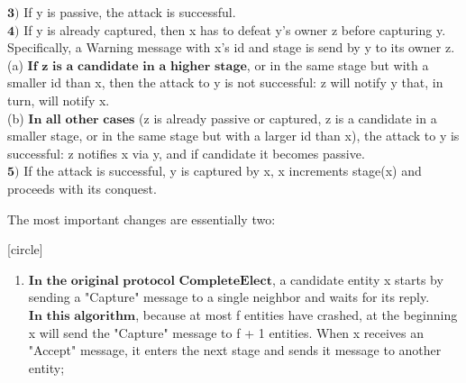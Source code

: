 \documentclass{beamer}
\begin{document}
\begin{frame}
\begin{block}{}
$\textbf{3)}$ If y is passive, the attack is successful.\\ \medskip
$\textbf{4)}$ If y is already captured, then x has to defeat y's owner z before capturing y. Specifically, a Warning message with x's id and stage is send by y to its owner z.\\ \medskip
(a) $\textbf{If z is a candidate in a higher stage}$, or in the same stage but with a smaller id than x, then the attack to y is not successful: z will notify y that, in turn, will notify x.\\ \medskip
(b) $\textbf{In all other cases}$ (z is already passive or captured, z is a candidate in a smaller stage, or in the same stage but with a larger id than x), the attack to y is successful: z notifies x via y, and if candidate it becomes passive.\\
\medskip
$\textbf{5)}$ If the attack is successful, y is captured by x, x increments stage(x) and proceeds with its conquest.
\end{block}
\end{frame}

\begin{frame}
The most important changes are essentially two:
\begin{flushleft}
\end{flushleft}
[circle]
\begin{enumerate}
\item $\textbf{In the original protocol CompleteElect}$, a candidate entity x starts by sending a "Capture" message to a single neighbor and waits for its reply.\\
\medskip
$\textbf{In this algorithm}$, because at most f entities have crashed, at the beginning x will send the "Capture" message to f + 1 entities. When x receives an "Accept" message, it enters the next stage and sends it message to another entity;\\
\end{enumerate}
\end{frame}
\end{document}
